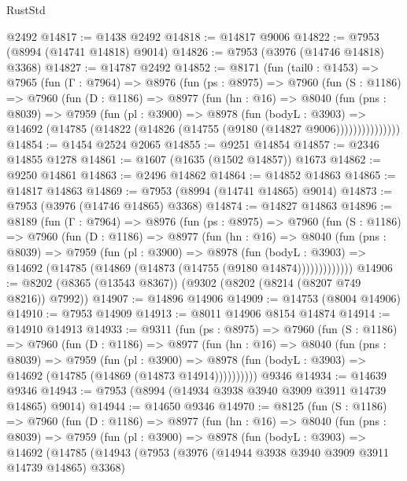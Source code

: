 \begin{lexlean}{RustStd}
\begin{coremodule}
    @2492
@14817 := @1438 @2492
@14818 := @14817 @9006
@14822 := @7953 (@8994 (@14741 @14818) @9014)
@14826 := @7953 (@3976 (@14746 @14818) @3368)
@14827 := @14787 @2492
@14852 := @8171
    (fun (tail0 : @1453) =>
    @7965
      (fun (Γ : @7964) =>
      @8976
        (fun (ps : @8975) =>
        @7960
          (fun (S : @1186) =>
          @7960
            (fun (D : @1186) =>
            @8977
              (fun (hn : @16) =>
              @8040
                (fun (pns : @8039) =>
                @7959
                  (fun (pl : @3900) =>
                  @8978
                    (fun (bodyL : @3903) =>
                    @14692 (@14785 (@14822 (@14826 (@14755 (@9180 (@14827 @9006)))))))))))))))
@14854 := @1454 @2524 @2065
@14855 := @9251 @14854
@14857 := @2346 @14855 @1278
@14861 := @1607 (@1635 (@1502 @14857)) @1673
@14862 := @9250 @14861
@14863 := @2496 @14862
@14864 := @14852 @14863
@14865 := @14817 @14863
@14869 := @7953 (@8994 (@14741 @14865) @9014)
@14873 := @7953 (@3976 (@14746 @14865) @3368)
@14874 := @14827 @14863
@14896 := @8189
    (fun (Γ : @7964) =>
    @8976
      (fun (ps : @8975) =>
      @7960
        (fun (S : @1186) =>
        @7960
          (fun (D : @1186) =>
          @8977
            (fun (hn : @16) =>
            @8040
              (fun (pns : @8039) =>
              @7959
                (fun (pl : @3900) =>
                @8978
                  (fun (bodyL : @3903) =>
                  @14692 (@14785 (@14869 (@14873 (@14755 (@9180 @14874)))))))))))))
@14906 := @8202 (@8365 (@13543 @8367)) (@9302 (@8202 (@8214 (@8207 @749 @8216)) @7992))
@14907 := @14896 @14906
@14909 := @14753 (@8004 @14906)
@14910 := @7953 @14909
@14913 := @8011 @14906 @8154 @14874
@14914 := @14910 @14913
@14933 := @9311
    (fun (ps : @8975) =>
    @7960
      (fun (S : @1186) =>
      @7960
        (fun (D : @1186) =>
        @8977
          (fun (hn : @16) =>
          @8040
            (fun (pns : @8039) =>
            @7959
              (fun (pl : @3900) =>
              @8978 (fun (bodyL : @3903) => @14692 (@14785 (@14869 (@14873 @14914))))))))))
    @9346
@14934 := @14639 @9346
@14943 := @7953 (@8994 (@14934 @3938 @3940 @3909 @3911 @14739 @14865) @9014)
@14944 := @14650 @9346
@14970 := @8125
    (fun (S : @1186) =>
    @7960
      (fun (D : @1186) =>
      @8977
        (fun (hn : @16) =>
        @8040
          (fun (pns : @8039) =>
          @7959
            (fun (pl : @3900) =>
            @8978
              (fun (bodyL : @3903) =>
              @14692
                (@14785
                  (@14943
                    (@7953
                      (@3976 (@14944 @3938 @3940 @3909 @3911 @14739 @14865) @3368)

\end{coremodule}
\end{lexlean}
